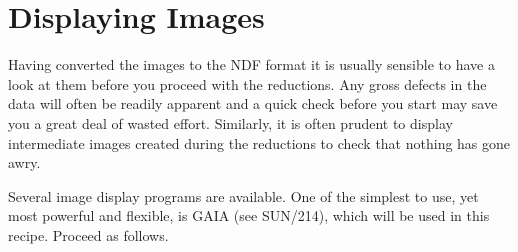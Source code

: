 \documentclass[twoside,11pt]{article}
\newcommand{\xref}[3]{#1}
\newcommand{\xlabel}[1]{}
\begin{document}
\newpage
\section{\xlabel{DISPLAY}\label{DISPLAY}Displaying Images}

Having converted the images to the NDF format it is usually sensible
to have a look at them before you proceed with the reductions.  Any gross
defects in the data will often be readily apparent and a quick check
before you start may save you a great deal of wasted effort.  Similarly,
it is often prudent to display intermediate images created during the
reductions to check that nothing has gone awry.

Several image display programs are available.  One of the simplest to
use, yet most powerful and flexible, is GAIA (see
\xref{SUN/214}{sun214}{}\/\cite{SUN214}), which will be used in this
recipe.  Proceed as follows.
\end{document}
